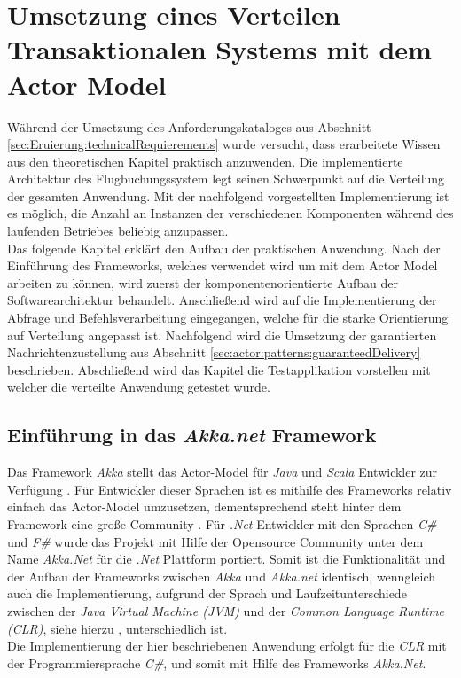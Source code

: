 \chapter{Umsetzung eines Verteilen Transaktionalen Systems mit dem Actor Model} 
\label{cha:practicalDevelopment}

Während der Umsetzung des Anforderungskataloges aus Abschnitt \ref{sec:Eruierung:technicalRequierements} wurde versucht, dass erarbeitete Wissen aus den theoretischen Kapitel praktisch anzuwenden. Die implementierte Architektur des Flugbuchungssystem legt seinen Schwerpunkt auf die Verteilung der gesamten Anwendung. Mit der nachfolgend vorgestellten Implementierung ist es möglich, die Anzahl an Instanzen der verschiedenen Komponenten während des laufenden Betriebes beliebig anzupassen. \\
Das folgende Kapitel erklärt den Aufbau der praktischen Anwendung. Nach der Einführung des Frameworks, welches verwendet wird um mit dem Actor Model arbeiten zu können, wird zuerst der komponentenorientierte Aufbau der Softwarearchitektur behandelt. Anschließend wird auf die Implementierung der Abfrage und Befehlsverarbeitung eingegangen, welche für die starke Orientierung auf Verteilung angepasst ist. Nachfolgend wird die Umsetzung der garantierten Nachrichtenzustellung aus Abschnitt \ref{sec:actor:patterns:guaranteedDelivery} beschrieben. Abschließend wird das Kapitel die Testapplikation vorstellen mit welcher die verteilte Anwendung getestet wurde.

\section{Einführung in das \textit{Akka.net} Framework}
\label{sec:implementation:akka}
Das Framework \textit{Akka} stellt das Actor-Model für \textit{Java} und \textit{Scala} Entwickler zur Verfügung \citep{gupta2012akkaEssentiaol}. Für Entwickler dieser Sprachen ist es mithilfe des Frameworks relativ einfach das Actor-Model umzusetzen, dementsprechend steht hinter dem Framework eine große Community  \citep{Vernon2015ReactiveAkka}. Für \textit{.Net} Entwickler mit den Sprachen \textit{C\#} und \textit{F\#} wurde das Projekt mit Hilfe der Opensource Community unter dem Name \textit{Akka.Net} für die \textit{.Net} Plattform portiert. Somit ist die Funktionalität und der Aufbau der Frameworks zwischen \textit{Akka} und \textit{Akka.net} identisch, wenngleich auch die Implementierung, aufgrund der Sprach und Laufzeitunterschiede zwischen der \textit{Java Virtual Machine (JVM)} und der \textit{Common Language Runtime (CLR)}, siehe hierzu \cite{JvmVsClrsinger2003jvm}, unterschiedlich ist. \\
Die Implementierung der hier beschriebenen Anwendung erfolgt für die \textit{CLR} mit der Programmiersprache \textit{C\#}, und somit mit Hilfe des Frameworks \textit{Akka.Net}. 

